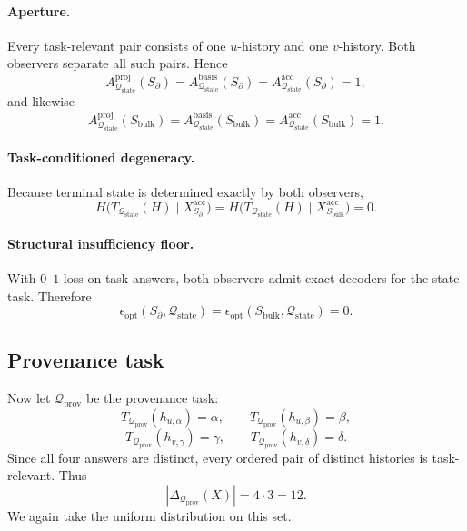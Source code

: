 \documentclass[11pt,twoside]{article}
\theoremstyle{definition}
\newcommand{\proj}{\mathrm{proj}}
\newcommand{\basis}{\mathrm{basis}}
\newcommand{\acc}{\mathrm{acc}}
\newcommand{\bulk}{\mathrm{bulk}}
\begin{document}
\paragraph{Aperture.}
Every task-relevant pair consists of one \(u\)-history and one \(v\)-history. Both observers separate all such pairs. Hence
\[
  A^{\proj}_{\mathcal{Q}_{\mathrm{state}}}(S_{\partial})
  =
  A^{\basis}_{\mathcal{Q}_{\mathrm{state}}}(S_{\partial})
  =
  A^{\acc}_{\mathcal{Q}_{\mathrm{state}}}(S_{\partial})
  = 1,
\]
and likewise
\[
  A^{\proj}_{\mathcal{Q}_{\mathrm{state}}}(S_{\bulk})
  =
  A^{\basis}_{\mathcal{Q}_{\mathrm{state}}}(S_{\bulk})
  =
  A^{\acc}_{\mathcal{Q}_{\mathrm{state}}}(S_{\bulk})
  = 1.
\]

\paragraph{Task-conditioned degeneracy.}
Because terminal state is determined exactly by both observers,
\[
  H\!\bigl(T_{\mathcal{Q}_{\mathrm{state}}}(H)\mid X_{S_{\partial}}^{\acc}\bigr)
  =
  H\!\bigl(T_{\mathcal{Q}_{\mathrm{state}}}(H)\mid X_{S_{\bulk}}^{\acc}\bigr)
  =
  0.
\]

\paragraph{Structural insufficiency floor.}
With \(0\)--\(1\) loss on task answers, both observers admit exact decoders for the state task. Therefore
\[
  \epsilon_{\mathrm{opt}}(S_{\partial},\mathcal{Q}_{\mathrm{state}})
  =
  \epsilon_{\mathrm{opt}}(S_{\bulk},\mathcal{Q}_{\mathrm{state}})
  =
  0.
\]

\subsection{Provenance task}
\label{app:boundary-bulk-prov-task}

Now let \(\mathcal{Q}_{\mathrm{prov}}\) be the provenance task:
\[
  T_{\mathcal{Q}_{\mathrm{prov}}}(h_{u,\alpha})=\alpha,\qquad
  T_{\mathcal{Q}_{\mathrm{prov}}}(h_{u,\beta})=\beta,
\]
\[
  T_{\mathcal{Q}_{\mathrm{prov}}}(h_{v,\gamma})=\gamma,\qquad
  T_{\mathcal{Q}_{\mathrm{prov}}}(h_{v,\delta})=\delta.
\]
Since all four answers are distinct, every ordered pair of distinct histories is task-relevant. Thus
\[
  |\Delta_{\mathcal{Q}_{\mathrm{prov}}}(X)| = 4\cdot 3 = 12.
\]
We again take the uniform distribution on this set.
\end{document}
